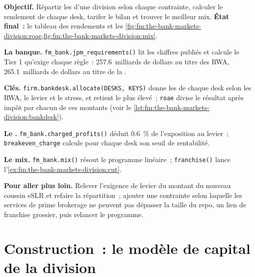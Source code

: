 \begin{tutorial}
\textbf{Objectif.} Répartir les  d'une division selon chaque contrainte, calculer le rendement de chaque desk, tarifer le bilan et trouver le meilleur mix.
\textbf{État final~:} le tableau des rendements et les \cref{fig:fm:the-bank-markets-division:roae,fig:fm:the-bank-markets-division:mix}.
\begin{tutsteps}
\item \textbf{La banque.} \texttt{fm\_bank.jpm\_requirements()} lit les chiffres publiés et calcule le Tier 1 qu'exige chaque règle~:
257.6~milliards de dollars au titre des RWA, 265.1~milliards de dollars au titre de la .
\item \textbf{Clés.} \texttt{firm.bankdesk.allocate(DESKS, KEYS)} donne les  de chaque desk selon les RWA, le levier et le stress, et retient le plus élevé~;
\texttt{roae} divise le résultat après impôt par chacun de ces montants (voir le \cref{lst:fm:the-bank-markets-division:bankdesk}).
\item \textbf{Le .} \texttt{fm\_bank.charged\_profits()} déduit 0.6~\% de l'exposition au levier~; \texttt{breakeven\_charge} calcule pour
chaque desk son seuil de rentabilité.
\item \textbf{Le mix.} \texttt{fm\_bank.mix()} résout le programme linéaire~; \texttt{franchise()} lance l'\cref{ex:fm:the-bank-markets-division:cut}.
\end{tutsteps}
\end{tutorial}

\textbf{Pour aller plus loin.} Relever l'exigence de levier du montant du nouveau coussin eSLR et refaire la répartition~; ajouter une contrainte selon laquelle les services de prime brokerage
ne peuvent pas dépasser la taille du repo, un lien de franchise grossier, puis relancer le programme.

\section{Construction~: le modèle de capital de la division}\label{bld:fm:the-bank-markets-division:bankdesk}

